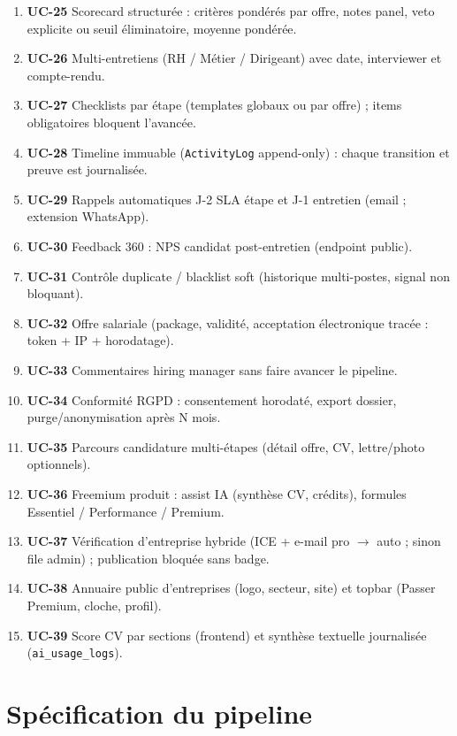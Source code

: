 \documentclass[12pt,a4paper,oneside]{report}
\begin{document}
\begin{enumerate}[leftmargin=1.3em,start=25]
  \item \textbf{UC-25} Scorecard structurée : critères pondérés par offre, notes panel, veto explicite ou seuil éliminatoire, moyenne pondérée.
  \item \textbf{UC-26} Multi-entretiens (RH / Métier / Dirigeant) avec date, interviewer et compte-rendu.
  \item \textbf{UC-27} Checklists par étape (templates globaux ou par offre) ; items obligatoires bloquent l'avancée.
  \item \textbf{UC-28} Timeline immuable (\texttt{ActivityLog} append-only) : chaque transition et preuve est journalisée.
  \item \textbf{UC-29} Rappels automatiques J-2 SLA étape et J-1 entretien (email ; extension WhatsApp).
  \item \textbf{UC-30} Feedback 360 : NPS candidat post-entretien (endpoint public).
  \item \textbf{UC-31} Contrôle duplicate / blacklist soft (historique multi-postes, signal non bloquant).
  \item \textbf{UC-32} Offre salariale (package, validité, acceptation électronique tracée : token + IP + horodatage).
  \item \textbf{UC-33} Commentaires hiring manager sans faire avancer le pipeline.
  \item \textbf{UC-34} Conformité RGPD : consentement horodaté, export dossier, purge/anonymisation après N mois.
  \item \textbf{UC-35} Parcours candidature multi-étapes (détail offre, CV, lettre/photo optionnels).
  \item \textbf{UC-36} Freemium produit : assist IA (synthèse CV, crédits), formules Essentiel / Performance / Premium.
  \item \textbf{UC-37} Vérification d'entreprise hybride (ICE + e-mail pro $\rightarrow$ auto ; sinon file admin) ; publication bloquée sans badge.
  \item \textbf{UC-38} Annuaire public d'entreprises (logo, secteur, site) et topbar (Passer Premium, cloche, profil).
  \item \textbf{UC-39} Score CV par sections (frontend) et synthèse textuelle journalisée (\texttt{ai\_usage\_logs}).
\end{enumerate}

\chapter{Spécification du pipeline}
\label{ch:pipeline}
\end{document}
